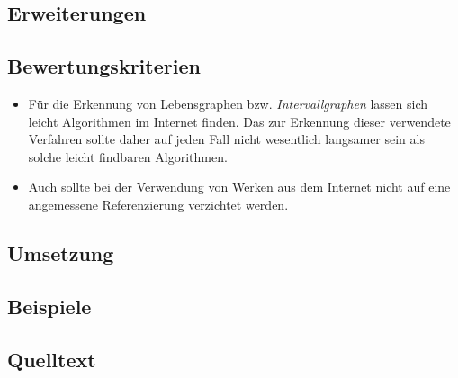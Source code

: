 \subsection{Erweiterungen}

\subsection{Bewertungskriterien}

\begin{itemize}
\item Für die Erkennung von Lebensgraphen bzw. \emph{Intervallgraphen} lassen sich leicht Algorithmen im Internet finden. Das zur Erkennung dieser verwendete Verfahren sollte daher auf jeden Fall nicht wesentlich langsamer sein als solche leicht findbaren Algorithmen.
\item Auch sollte bei der Verwendung von Werken aus dem Internet nicht auf eine angemessene Referenzierung verzichtet werden.
\end{itemize}


 \subsection{Umsetzung}
\subsection{Beispiele}
\subsection{Quelltext}